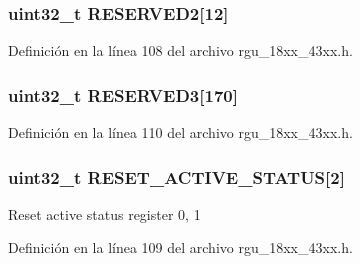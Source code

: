 \subsubsection[{\texorpdfstring{R\+E\+S\+E\+R\+V\+E\+D2}{RESERVED2}}]{ uint32\+\_\+t R\+E\+S\+E\+R\+V\+E\+D2\mbox{[}12\mbox{]}}\hypertarget{struct_l_p_c___r_g_u___t_a8ef8e2ec407e4e4c350cd8b370d7cadf}{}\label{struct_l_p_c___r_g_u___t_a8ef8e2ec407e4e4c350cd8b370d7cadf}


Definición en la línea 108 del archivo rgu\+\_\+18xx\+\_\+43xx.\+h.

\subsubsection[{\texorpdfstring{R\+E\+S\+E\+R\+V\+E\+D3}{RESERVED3}}]{ uint32\+\_\+t R\+E\+S\+E\+R\+V\+E\+D3\mbox{[}170\mbox{]}}\hypertarget{struct_l_p_c___r_g_u___t_abf5aa820a604f8ba570f6a2704b3dae8}{}\label{struct_l_p_c___r_g_u___t_abf5aa820a604f8ba570f6a2704b3dae8}


Definición en la línea 110 del archivo rgu\+\_\+18xx\+\_\+43xx.\+h.

\subsubsection[{\texorpdfstring{R\+E\+S\+E\+T\+\_\+\+A\+C\+T\+I\+V\+E\+\_\+\+S\+T\+A\+T\+US}{RESET_ACTIVE_STATUS}}]{ uint32\+\_\+t R\+E\+S\+E\+T\+\_\+\+A\+C\+T\+I\+V\+E\+\_\+\+S\+T\+A\+T\+US\mbox{[}2\mbox{]}}\hypertarget{struct_l_p_c___r_g_u___t_afefb87caf05582948b30c219edfcd2e3}{}\label{struct_l_p_c___r_g_u___t_afefb87caf05582948b30c219edfcd2e3}
Reset active status register 0, 1 

Definición en la línea 109 del archivo rgu\+\_\+18xx\+\_\+43xx.\+h.

